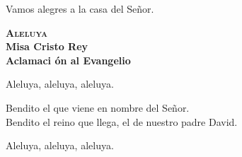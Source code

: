 \documentclass[letterpaper]{report}
\begin{document}
    Vamos alegres a la casa del Se\~nor.
    \clearpage
    
    \begin{center}
        {\scshape \Huge {\bfseries Aleluya}} \\
        {\LARGE {\bfseries Misa Cristo Rey}} \\
        {\Large {\bfseries Aclamaci \'on al Evangelio}}
    \end{center}
    
    Aleluya, aleluya, aleluya.
  
    Bendito el que viene en nombre del Se\~nor.\\
    Bendito el reino que llega, el de nuestro padre David.
  
    Aleluya, aleluya, aleluya.
    \clearpage
\end{document}
